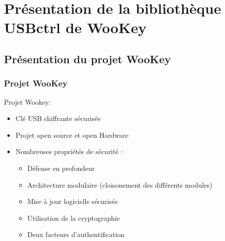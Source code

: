 \documentclass[french]{beamer}
\begin{document}
\section[Bibliothèque USBctrl]{Présentation de la bibliothèque USBctrl de WooKey}

\subsection{Présentation du projet WooKey}

\begin{frame}[t] %
\frametitle{Projet WooKey}

Projet Wookey:
\begin{itemize}
	\item Clé USB chiffrante sécurisée
	\item Projet open source et open Hardware
	\item Nombreuses propriétés de sécurité :
		\begin{itemize}
			\item Défense en profondeur
			\item Architecture modulaire (cloisonement des différents modules)
			\item Mise à jour logicielle sécurisée
			\item Utilisation de la cryptographie
			\item Deux facteurs d'authentification
		\end{itemize}
\end{itemize}

\end{frame}
\end{document}
